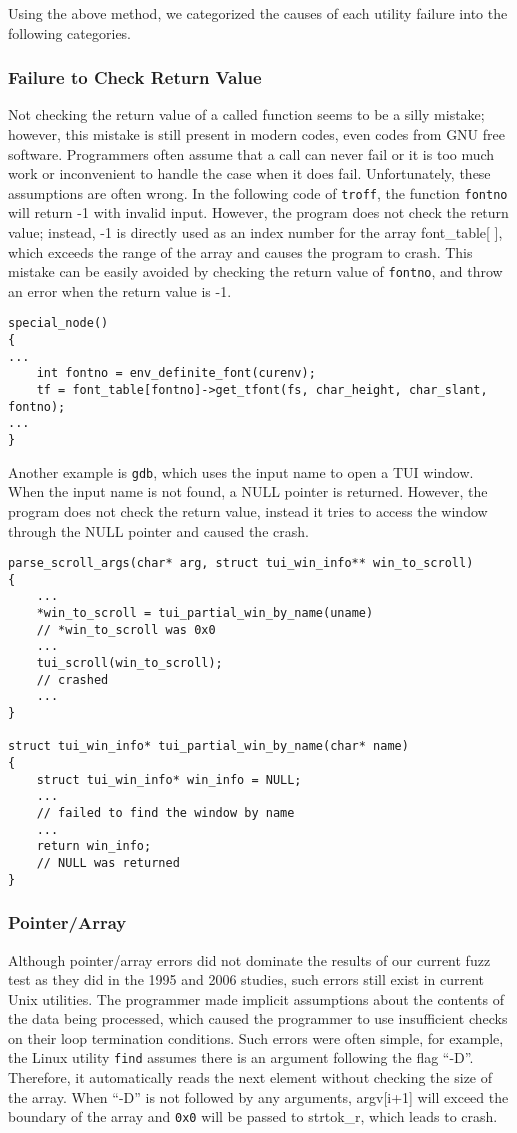 Using the above method, we categorized the causes of each utility failure into the following categories.


\subsubsection{Failure to Check Return Value}
Not checking the return value of a called function seems to be a silly mistake; however, this mistake is still present in modern codes, even codes from GNU free software. Programmers often assume that a call can never fail or it is too much work or inconvenient to handle the case when it does fail. Unfortunately, these assumptions are often wrong. In the following code of \texttt{troff}, the function \texttt{fontno} will return -1 with invalid input. However, the program does not check the return value; instead, -1 is directly used as an index number for the array font\_table[ ], which exceeds the range of the array and causes the program to crash. This mistake can be easily avoided by checking the return value of \texttt{fontno}, and throw an error when the return value is -1.
\begin{verbatim}
special_node()
{
...
    int fontno = env_definite_font(curenv);
    tf = font_table[fontno]->get_tfont(fs, char_height, char_slant, fontno);
...
}
\end{verbatim}

Another example is \texttt{gdb}, which uses the input name to open a TUI window. When the input name is not found, a NULL pointer is returned. However, the program does not check the return value, instead it tries to access the window through the NULL pointer and caused the crash. 

\begin{verbatim}
parse_scroll_args(char* arg, struct tui_win_info** win_to_scroll)
{
    ...
    *win_to_scroll = tui_partial_win_by_name(uname)
    // *win_to_scroll was 0x0
    ...
    tui_scroll(win_to_scroll);
    // crashed
    ...
}

struct tui_win_info* tui_partial_win_by_name(char* name)
{
    struct tui_win_info* win_info = NULL;
    ...
    // failed to find the window by name
    ...
    return win_info;
    // NULL was returned
}
\end{verbatim}


\subsubsection{Pointer/Array}
Although pointer/array errors did not dominate the results of our current fuzz test as they did in the 1995 and 2006 studies, such errors still exist in current Unix utilities. The programmer made implicit assumptions about the contents of the data being processed, which caused the programmer to use insufficient checks on their loop termination conditions. Such errors were often simple, for example, the Linux utility \texttt{find} assumes there is an argument following the flag “-D”. Therefore, it automatically reads the next element without checking the size of the array. When “-D” is not followed by any arguments, argv[i+1] will exceed the boundary of the array and \texttt{0x0} will be passed to strtok\_r, which leads to crash.


